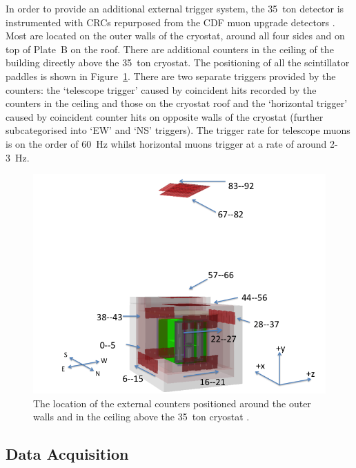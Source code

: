 In order to provide an additional external trigger system, the 35~ton detector is instrumented with CRCs repurposed from the CDF muon upgrade detectors \cite{CDFCounters2005}.  Most are located on the outer walls of the cryostat, around all four sides and on top of Plate~B on the roof.  There are additional counters in the ceiling of the building directly above the 35~ton cryostat.  The positioning of all the scintillator paddles is shown in Figure~\ref{fig:35tonExternalCounters}.  There are two separate triggers provided by the counters: the `telescope trigger' caused by coincident hits recorded by the counters in the ceiling and those on the cryostat roof and the `horizontal trigger' caused by coincident counter hits on opposite walls of the cryostat (further subcategorised into `EW' and `NS' triggers).  The trigger rate for telescope muons is on the order of 60~Hz whilst horizontal muons trigger at a rate of around 2-3~Hz.

\begin{figure}
  \centering
  \includegraphics[width=12cm]{35tonExternalCounters.png}
  \caption[The location of the external counters positioned around the outer walls and in the ceiling above the 35~ton cryostat.]{The location of the external counters positioned around the outer walls and in the ceiling above the 35~ton cryostat \cite{35tonExternalCounters}.}
  \label{fig:35tonExternalCounters}
\end{figure}

\subsection{Data Acquisition}\label{sec:35tonDataAcquisition}


